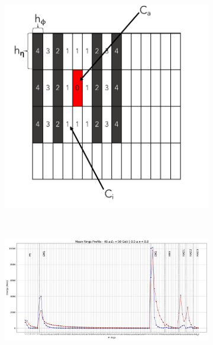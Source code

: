 


\begin{figure}[!ht]
  \begin{center}
  \begin{subfigure}[c]{.48\textwidth}
  \centering
  \includegraphics[width=\textwidth]{sections/ringer/figures/reco_steps/ring_em1_mask.pdf}
  \end{subfigure}\\
  \centering
  \begin{subfigure}[c]{.7\textwidth}
  \centering
  \includegraphics[width=\textwidth]{sections/ringer/figures/reco_steps/rings_profile.png}
  \end{subfigure}



\end{center}
\end{figure}
